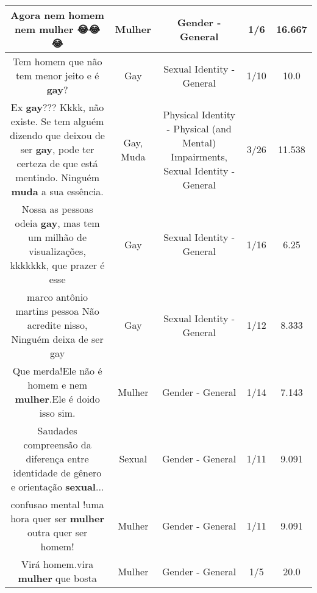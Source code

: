\documentclass[11pt]{article}
\newlength\mylength
\begin{document}
\begin{center}
\begin{longtable}{|C{.65\mylength}|C{.30\mylength}|C{.12\mylength}|C{.12\mylength}|C{.12\mylength}|}
  \small Agora nem homem nem \textbf{mulher} 😂😂😂\normalsize   & Mulher & Gender - General & 1/6 & 16.667 \\  \hline
  \small Tem homem que não tem menor jeito e é \textbf{gay}?\normalsize   & Gay & Sexual Identity - General & 1/10 & 10.0 \\  \hline
  \small Ex \textbf{gay}???  Kkkk, não existe. Se tem alguém dizendo que deixou de ser \textbf{gay}, pode ter certeza de que está mentindo. Ninguém \textbf{muda} a sua essência.\normalsize   & Gay, Muda & Physical Identity - Physical (and Mental) Impairments, Sexual Identity - General & 3/26 & 11.538 \\  \hline
  \small Nossa as pessoas odeia \textbf{gay}, mas tem um milhão de visualizações, kkkkkkk, que prazer é esse\normalsize   & Gay & Sexual Identity - General & 1/16 & 6.25 \\  \hline
  \small marco antônio martins pessoa Não acredite nisso,  Ninguém deixa de ser gay\normalsize   & Gay & Sexual Identity - General & 1/12 & 8.333 \\  \hline
  \small Que merda!Ele não é homem e nem \textbf{mulher}.Ele é doido isso sim.\normalsize   & Mulher & Gender - General & 1/14 & 7.143 \\  \hline
  \small Saudades compreensão da diferença entre identidade de gênero e orientação \textbf{sexual}...\normalsize   & Sexual & Gender - General & 1/11 & 9.091 \\  \hline
  \small confusao mental !uma hora quer ser \textbf{mulher} outra quer ser homem!\normalsize   & Mulher & Gender - General & 1/11 & 9.091 \\  \hline
  \small Virá homem.vira \textbf{mulher} que bosta\normalsize   & Mulher & Gender - General & 1/5 & 20.0 \\  \hline

\end{longtable}
\end{center}
\end{document}
